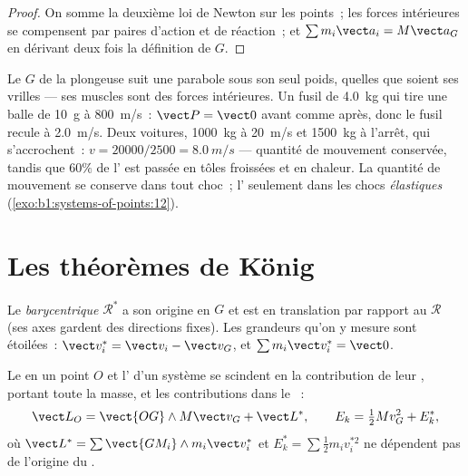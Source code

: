 \begin{proof}
On somme la deuxième loi de Newton sur les points~; les forces
intérieures se compensent par paires d'action et de réaction~; et
$\sum m_i\vect a_i = M\vect a_G$ en dérivant deux fois la définition de $G$.
\end{proof}

\begin{example}\label{ex:b1:systems-of-points:cm}
Le $G$ de la plongeuse suit une parabole sous son seul poids, quelles que
soient ses vrilles --- ses muscles sont des forces intérieures. Un fusil
de \qty{4.0}{kg} qui tire une balle de \qty{10}{g} à \qty{800}{m/s}~:
$\vect P = \vect 0$ avant comme après, donc le fusil recule à
\qty{2.0}{m/s}. Deux voitures, \qty{1000}{kg} à \qty{20}{m/s} et
\qty{1500}{kg} à l'arrêt, qui s'accrochent~: $v =
20000/2500 = \qty{8.0}{m/s}$ --- quantité de mouvement conservée, tandis
que $60\%$ de l' est passée en tôles froissées et en
chaleur. La quantité de mouvement se conserve dans tout choc~; l' seulement dans les chocs \emph{élastiques}
(\cref{exo:b1:systems-of-points:12}).
\end{example}

\section{Les théorèmes de König}

\begin{definition}\label{def:b1:systems-of-points:barycentric}
Le \emph{ barycentrique} $\mathcal R^*$ a son origine en $G$
et est en translation par rapport au  $\mathcal R$
(ses axes gardent des directions fixes). Les grandeurs qu'on y mesure
sont étoilées~: $\vect v_i^*
= \vect v_i - \vect v_G$, et $\sum m_i\vect v_i^* = \vect 0$.
\end{definition}

\begin{theorem}\label{thm:b1:systems-of-points:koenig}
Le  en un point $O$ et l' d'un système
se scindent en la contribution de leur , portant toute la
masse, et les contributions dans le ~:
\[
\vect L_O = \vect{OG}\wedge M\vect v_G + \vect L^*, \qquad
E_k = \tfrac12 Mv_G^2 + E_k^*,
\]
où $\vect L^* = \sum\vect{GM_i}\wedge m_i\vect v_i^*$ et $E_k^* = \sum\tfrac12
m_iv_i^{*2}$ ne dépendent pas de l'origine du .
\end{theorem}

